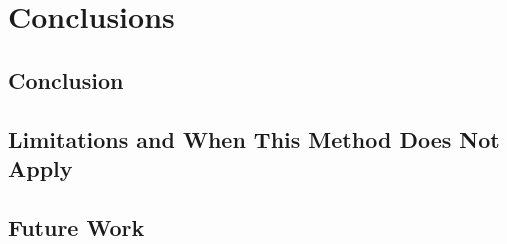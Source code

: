 \chapter{Conclusions}
\label{ch:conclusion}

\section{Conclusion}
\label{sec:concl:summary}


\section{Limitations and When This Method Does Not Apply}
\label{sec:concl:limits}


\section{Future Work}
\label{sec:concl:future}

